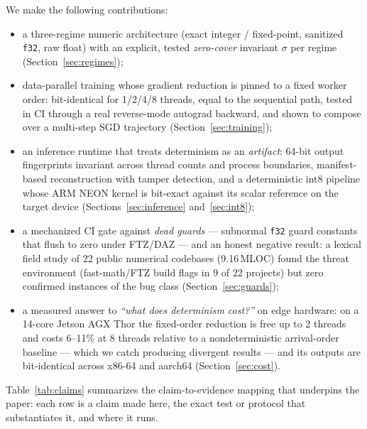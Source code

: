 \documentclass[sigconf,review]{acmart}
\begin{document}
We make the following contributions:
\begin{itemize}
  \item a three-regime numeric architecture (exact integer / fixed-point,
    sanitized \texttt{f32}, raw float) with an explicit, tested
    \emph{zero-cover} invariant $\sigma$ per regime
    (Section~\ref{sec:regimes});
  \item data-parallel training whose gradient reduction is pinned to a fixed
    worker order: bit-identical for 1/2/4/8 threads, equal to the sequential
    path, tested in CI through a real reverse-mode autograd backward, and
    shown to compose over a multi-step SGD trajectory
    (Section~\ref{sec:training});
  \item an inference runtime that treats determinism as an \emph{artifact}:
    64-bit output fingerprints invariant across thread counts and process
    boundaries, manifest-based reconstruction with tamper detection, and a
    deterministic int8 pipeline whose ARM NEON kernel is bit-exact against
    its scalar reference on the target device (Sections~\ref{sec:inference}
    and~\ref{sec:int8});
  \item a mechanized CI gate against \emph{dead guards} --- subnormal
    \texttt{f32} guard constants that flush to zero under FTZ/DAZ --- and an
    honest negative result: a lexical field study of 22 public numerical
    codebases (9.16\,MLOC) found the threat environment (fast-math/FTZ
    build flags in 9 of 22 projects) but zero confirmed instances of the
    bug class (Section~\ref{sec:guards});
  \item a measured answer to \emph{``what does determinism cost?''} on edge
    hardware: on a 14-core Jetson AGX Thor the fixed-order reduction is
    free up to 2 threads and costs 6--11\% at 8 threads relative to a
    nondeterministic arrival-order baseline --- which we catch producing
    divergent results --- and its outputs are bit-identical across x86-64
    and aarch64 (Section~\ref{sec:cost}).
\end{itemize}

Table~\ref{tab:claims} summarizes the claim-to-evidence mapping that
underpins the paper: each row is a claim made here, the exact test or
protocol that substantiates it, and where it runs.
\end{document}
